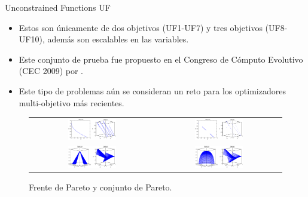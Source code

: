 \documentclass{beamer}
\begin{document}
\begin{frame}{Unconstrained Functions UF}
\begin{itemize}
\scriptsize
   \item Estos son únicamente de dos objetivos (UF1-UF7) y tres objetivos (UF8-UF10), además son escalables en las variables.
   \item Este conjunto de prueba fue propuesto en el Congreso de Cómputo Evolutivo (CEC 2009) por \citeauthor{Joel:CEC2009}.
   \item Este tipo de problemas aún se consideran un reto para los optimizadores multi-objetivo más recientes.
\end{itemize}
\begin{figure}[H]
\begin{tabular}{c c}
\includegraphics[width=0.4\textwidth]{Images/UF1.eps}     &  \includegraphics[width=0.4\textwidth]{Images/UF6.eps} \\
\includegraphics[width=0.4\textwidth]{Images/UF9.eps}     &  \includegraphics[width=0.4\textwidth]{Images/UF10.eps} \\
\end{tabular}
\centering
\caption{\scriptsize Frente de Pareto y conjunto de Pareto.}
\end{figure}

\end{frame}
\end{document}
